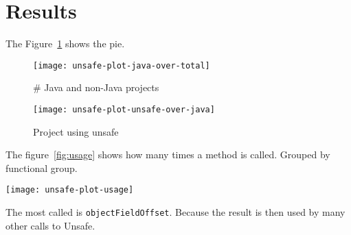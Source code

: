 
\section{Results} \label{sec:results}

The Figure~\ref{fig:java-over-total} shows the pie.

\begin{figure}[htb]
\centering
\texttt{[image: unsafe-plot-java-over-total]}
\caption{\# Java and non-Java projects} \label{fig:java-over-total}
\end{figure}

\begin{figure}[htb]
\centering
\texttt{[image: unsafe-plot-unsafe-over-java]}
\caption{Project using unsafe} \label{fig:unsafe-over-java}
\end{figure}

The figure~\ref{fig:usage} shows how many times a method is called. Grouped by functional group.

\begin{figure*}[htb]
\texttt{[image: unsafe-plot-usage]}
\caption{sun.misc.Unsafe methods usage} \label{fig:usage}
\end{figure*}

The most called is \texttt{objectFieldOffset}. Because the result is then used by many other calls to Unsafe.



